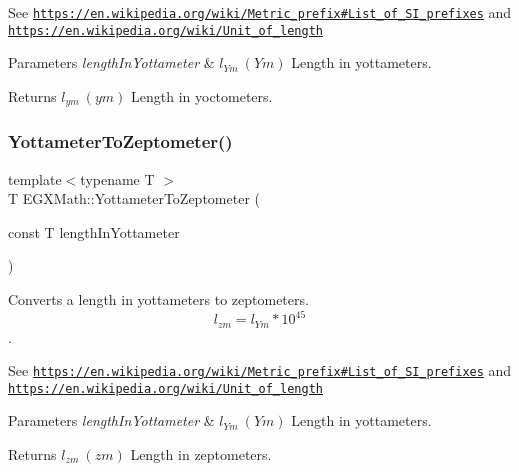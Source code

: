 See \href{https://en.wikipedia.org/wiki/Metric_prefix#List_of_SI_prefixes}{\tt https\+://en.\+wikipedia.\+org/wiki/\+Metric\+\_\+prefix\#\+List\+\_\+of\+\_\+\+S\+I\+\_\+prefixes} and \href{https://en.wikipedia.org/wiki/Unit_of_length}{\tt https\+://en.\+wikipedia.\+org/wiki/\+Unit\+\_\+of\+\_\+length} 
\begin{DoxyParams}{Parameters}
{\em length\+In\+Yottameter} & $ l_{Ym}\ (Ym)$ Length in yottameters. \\
\hline
\end{DoxyParams}
\begin{DoxyReturn}{Returns}
$ l_{ym}\ (ym)$ Length in yoctometers. 
\end{DoxyReturn}
\mbox{\label{group___e_g_x_math-_conversions-_length_conversions-_yottameter-_s_i_ga976c591d436c20684f2d55461a05da3e}} 
\subsubsection{\texorpdfstring{Yottameter\+To\+Zeptometer()}{YottameterToZeptometer()}}
{\footnotesize\ttfamily template$<$typename T $>$ \\
T E\+G\+X\+Math\+::\+Yottameter\+To\+Zeptometer (\begin{DoxyParamCaption}\item[{const T}]{length\+In\+Yottameter }\end{DoxyParamCaption})}



Converts a length in yottameters to zeptometers. \[ l_{zm}=l_{Ym} * 10^{45} \]. 

See \href{https://en.wikipedia.org/wiki/Metric_prefix#List_of_SI_prefixes}{\tt https\+://en.\+wikipedia.\+org/wiki/\+Metric\+\_\+prefix\#\+List\+\_\+of\+\_\+\+S\+I\+\_\+prefixes} and \href{https://en.wikipedia.org/wiki/Unit_of_length}{\tt https\+://en.\+wikipedia.\+org/wiki/\+Unit\+\_\+of\+\_\+length} 
\begin{DoxyParams}{Parameters}
{\em length\+In\+Yottameter} & $ l_{Ym}\ (Ym)$ Length in yottameters. \\
\hline
\end{DoxyParams}
\begin{DoxyReturn}{Returns}
$ l_{zm}\ (zm)$ Length in zeptometers. 
\end{DoxyReturn}
\mbox{\label{group___e_g_x_math-_conversions-_length_conversions-_yottameter-_s_i_gaec75915fd3b267aeff37cc104cfb3e9a}} 
